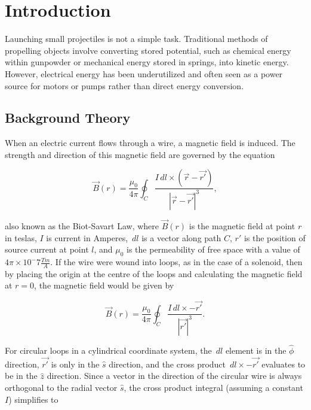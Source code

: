 \chapter{Introduction}

Launching small projectiles is not a simple task. Traditional methods of propelling objects involve converting stored potential, such as chemical energy within gunpowder or mechanical energy stored in springs, into kinetic energy. However, electrical energy has been underutilized and often seen as a power source for motors or pumps rather than direct energy conversion. 

\section{Background Theory}
When an electric current flows through a wire, a magnetic field is induced. The strength and direction of this magnetic field are governed by the equation 

\begin{equation}
	\vec{B}(r)=\frac{\mu_0}{4\pi}\oint_C \frac{I \,dl \times (\vec{r}-\vec{r'})}{|\vec{r}-\vec{r'}|^3},
\end{equation} 

\noindent also known as the Biot-Savart Law, where \(\vec{B}(r)\) is the magnetic field at point \(r\) in teslas, \(I\) is current in Amperes, \(\,dl\) is a vector along path \(C\), \(r'\) is the position of source current at point \(l\), and \(\mu_0\) is the permeability of free space with a value of \(4\pi \times 10^-7 \frac{Tm}{A}\). If the wire were wound into loops, as in the case of a solenoid, then by placing the origin at the centre of the loops and calculating the magnetic field at \(r=0\), the magnetic field would be given by

\begin{equation}
	\vec{B}(r)=\frac{\mu_0}{4\pi}\oint_C \frac{I \,dl \times -\vec{r'}}{|\vec{r'}|^3}.
\end{equation}

\noindent For circular loops in a cylindrical coordinate system, the \(\,dl\) element is in the \(\hat{\phi}\) direction, \(\vec{r'}\) is only in the \(\hat{s}\) direction, and the cross product \(\,dl \times -\vec{r'}\) evaluates to be in the \(\hat{z}\) direction. Since a vector in the direction of the circular wire is always orthogonal to the radial vector \(\hat{s}\), the cross product integral (assuming a constant \(I\)) simplifies to 

